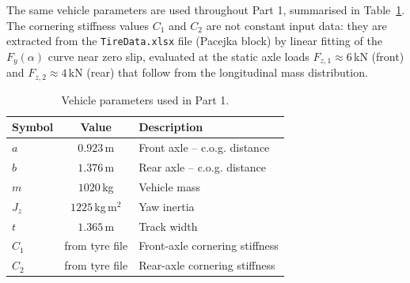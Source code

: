 The same vehicle parameters are used throughout Part 1, summarised in
Table~\ref{tab:params}. The cornering stiffness values $C_1$ and
$C_2$ are not constant input data: they are extracted from the
\texttt{TireData.xlsx} file (Pacejka block) by linear fitting of the
$F_y(\alpha)$ curve near zero slip, evaluated at the static axle loads
$F_{z,1}\!\approx\!6$\,kN (front) and $F_{z,2}\!\approx\!4$\,kN (rear)
that follow from the longitudinal mass distribution.

\begin{table}[H]
    \centering
    \begin{tabular}{lcl}
        \toprule
        \textbf{Symbol} & \textbf{Value} & \textbf{Description} \\
        \midrule
        $a$    & $0.923$\,m       & Front axle -- c.o.g. distance \\
        $b$    & $1.376$\,m       & Rear axle -- c.o.g. distance \\
        $m$    & $1020$\,kg       & Vehicle mass \\
        $J_z$  & $1225$\,kg\,m$^2$& Yaw inertia \\
        $t$    & $1.365$\,m       & Track width \\
        $C_1$  & from tyre file   & Front-axle cornering stiffness \\
        $C_2$  & from tyre file   & Rear-axle cornering stiffness \\
        \bottomrule
    \end{tabular}
    \caption{Vehicle parameters used in Part 1.}
    \label{tab:params}
\end{table}

